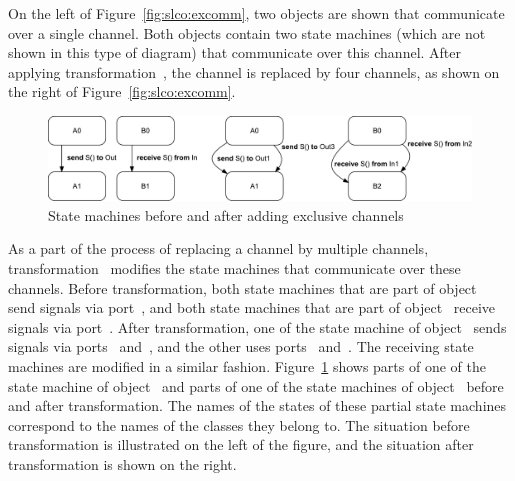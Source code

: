 On the left of Figure~\ref{fig:slco:excomm}, two objects are shown that communicate over a single channel.
Both objects contain two state machines (which are not shown in this type of diagram) that communicate over this channel.
After applying transformation~, the channel is replaced by four channels, as shown on the right of Figure~\ref{fig:slco:excomm}.

\begin{figure}[hbt]
  \centering
  \includegraphics[scale=0.45]{slco/figs/transformations/ExclusiveChannels_Behavior}
  \caption{State machines before and after adding exclusive channels}
  \label{fig:slco:exsm}
\end{figure}

As a part of the process of replacing a channel by multiple channels, transformation~ modifies the state machines that communicate over these channels.
Before transformation, both state machines that are part of object~ send signals via port~, and both state machines that are part of object~ receive signals via port~.
After transformation, one of the state machine of object~ sends signals via ports~ and~, and the other uses ports~ and~.
The receiving state machines are modified in a similar fashion.
Figure~\ref{fig:slco:exsm} shows parts of one of the state machine of object~ and parts of one of the state machines of object~ before and after transformation.
The names of the states of these partial state machines correspond to the names of the classes they belong to.
The situation before transformation is illustrated on the left of the figure, and the situation after transformation is shown on the right.


